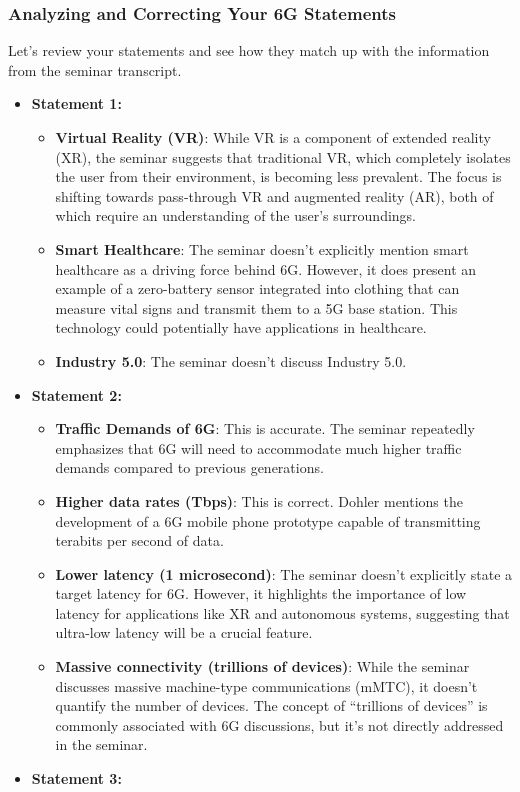 \documentclass[
]{article}
\author{}
\date{}
\begin{document}
\subsubsection{Analyzing and Correcting Your 6G
Statements}\label{analyzing-and-correcting-your-6g-statements}

Let's review your statements and see how they match up with the
information from the seminar transcript.

\begin{itemize}
\item
  \textbf{Statement 1:}

  \begin{itemize}
  
  \item
    \textbf{Virtual Reality (VR)}: While VR is a component of extended
    reality (XR), the seminar suggests that traditional VR, which
    completely isolates the user from their environment, is becoming
    less prevalent. The focus is shifting towards pass-through VR and
    augmented reality (AR), both of which require an understanding of
    the user's surroundings.
  \item
    \textbf{Smart Healthcare}: The seminar doesn't explicitly mention
    smart healthcare as a driving force behind 6G. However, it does
    present an example of a zero-battery sensor integrated into clothing
    that can measure vital signs and transmit them to a 5G base station.
    This technology could potentially have applications in healthcare.
  \item
    \textbf{Industry 5.0}: The seminar doesn't discuss Industry 5.0.
  \end{itemize}
\item
  \textbf{Statement 2:}

  \begin{itemize}
  
  \item
    \textbf{Traffic Demands of 6G}: This is accurate. The seminar
    repeatedly emphasizes that 6G will need to accommodate much higher
    traffic demands compared to previous generations.
  \item
    \textbf{Higher data rates (Tbps)}: This is correct. Dohler mentions
    the development of a 6G mobile phone prototype capable of
    transmitting terabits per second of data.
  \item
    \textbf{Lower latency (1 microsecond)}: The seminar doesn't
    explicitly state a target latency for 6G. However, it highlights the
    importance of low latency for applications like XR and autonomous
    systems, suggesting that ultra-low latency will be a crucial
    feature.
  \item
    \textbf{Massive connectivity (trillions of devices)}: While the
    seminar discusses massive machine-type communications (mMTC), it
    doesn't quantify the number of devices. The concept of ``trillions
    of devices'' is commonly associated with 6G discussions, but it's
    not directly addressed in the seminar.
  \end{itemize}
\item
  \textbf{Statement 3:}


\end{itemize}
\end{document}
